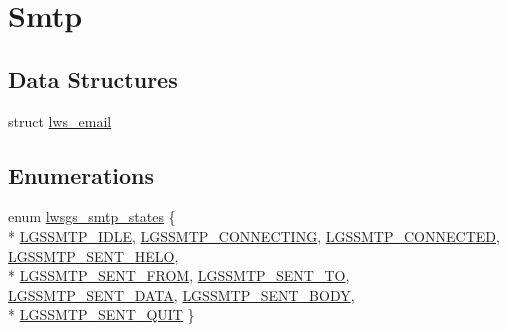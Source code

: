 \hypertarget{group__smtp}{}\section{Smtp}
\label{group__smtp}
\subsection*{Data Structures}
\begin{DoxyCompactItemize}
\item 
struct \hyperlink{structlws__email}{lws\+\_\+email}
\end{DoxyCompactItemize}
\subsection*{Enumerations}
\begin{DoxyCompactItemize}
\item 
enum \hyperlink{group__smtp_ga116be79bf44f9dc2a97f46e051fe4dc0}{lwsgs\+\_\+smtp\+\_\+states} \{ \\*
\hyperlink{group__smtp_gga116be79bf44f9dc2a97f46e051fe4dc0a29e5b0ecf75375b5a643faa3d6222b7c}{L\+G\+S\+S\+M\+T\+P\+\_\+\+I\+D\+LE}, 
\hyperlink{group__smtp_gga116be79bf44f9dc2a97f46e051fe4dc0ab89442b7a3ca2b94c3cdcf33756eb933}{L\+G\+S\+S\+M\+T\+P\+\_\+\+C\+O\+N\+N\+E\+C\+T\+I\+NG}, 
\hyperlink{group__smtp_gga116be79bf44f9dc2a97f46e051fe4dc0ab61778f70ecac007b334bb14942eb41d}{L\+G\+S\+S\+M\+T\+P\+\_\+\+C\+O\+N\+N\+E\+C\+T\+ED}, 
\hyperlink{group__smtp_gga116be79bf44f9dc2a97f46e051fe4dc0a1dfec948a864205cec875f63cbe0d4ad}{L\+G\+S\+S\+M\+T\+P\+\_\+\+S\+E\+N\+T\+\_\+\+H\+E\+LO}, 
\\*
\hyperlink{group__smtp_gga116be79bf44f9dc2a97f46e051fe4dc0a929bb4623ff3f585108aba2a1b047fab}{L\+G\+S\+S\+M\+T\+P\+\_\+\+S\+E\+N\+T\+\_\+\+F\+R\+OM}, 
\hyperlink{group__smtp_gga116be79bf44f9dc2a97f46e051fe4dc0aae20a0cb95b97a70f6b45d0ed2d5be83}{L\+G\+S\+S\+M\+T\+P\+\_\+\+S\+E\+N\+T\+\_\+\+TO}, 
\hyperlink{group__smtp_gga116be79bf44f9dc2a97f46e051fe4dc0a85e3c452950c09a79086bff4b9be5c14}{L\+G\+S\+S\+M\+T\+P\+\_\+\+S\+E\+N\+T\+\_\+\+D\+A\+TA}, 
\hyperlink{group__smtp_gga116be79bf44f9dc2a97f46e051fe4dc0a38fba41f28d754e38079b31418a86a69}{L\+G\+S\+S\+M\+T\+P\+\_\+\+S\+E\+N\+T\+\_\+\+B\+O\+DY}, 
\\*
\hyperlink{group__smtp_gga116be79bf44f9dc2a97f46e051fe4dc0a2c2ed16ffc572326e3040684084b21d5}{L\+G\+S\+S\+M\+T\+P\+\_\+\+S\+E\+N\+T\+\_\+\+Q\+U\+IT}
 \}
\end{DoxyCompactItemize}
